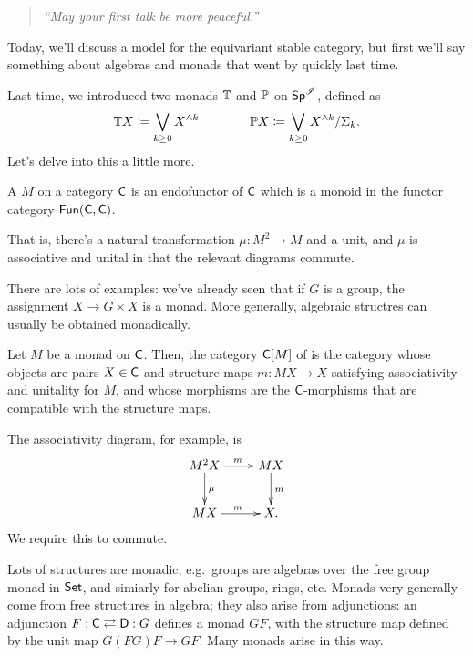 \begin{quote}\textit{
	``May your first talk be more peaceful.''
}\end{quote}
Today, we'll discuss a model for the equivariant stable category, but first we'll say something about algebras and
monads that went by quickly last time.

Last time, we introduced two monads $\T$ and $\P$ on $\Spc^\sI$, defined as
\[\T X\coloneqq \bigvee_{k\ge 0} X^{\wedge k}\qquad\qquad \P X\coloneqq \bigvee_{k\ge 0} X^{\wedge k}/\Sigma_k.\]
Let's delve into this a little more.
\begin{defn}
A  $M$ on a category $\fC$ is an endofunctor of $\fC$ which is a monoid in the functor category
$\Fun(\fC,\fC)$.
\end{defn}
That is, there's a natural transformation $\mu\colon M^2\to M$ and a unit, and $\mu$ is associative and unital in
that the relevant diagrams commute.

There are lots of examples: we've already seen that if $G$ is a group, the assignment $X\to G\times X$ is a monad.
More generally, algebraic structres can usually be obtained monadically.
\begin{defn}
Let $M$ be a monad on $\fC$. Then, the category $\fC[M]$ of  is the category whose objects
are pairs $X\in\fC$ and structure maps $m\colon MX\to X$ satisfying associativity and unitality for $M$, and whose
morphisms are the $\fC$-morphisms that are compatible with the structure maps.
\end{defn}
The associativity diagram, for example, is
\[\xymatrix{
	M^2X\ar[r]^m\ar[d]^\mu & MX\ar[d]^m\\
	MX\ar[r]^m & X.
}\]
We require this to commute.

Lots of structures are monadic, e.g.\ groups are algebras over the free group monad in $\Set$, and simiarly for
abelian groups, rings, etc. Monads very generally come from free structures in algebra; they also arise from
adjunctions: an adjunction $F:\fC\rightleftarrows\fD: G$ defines a monad $GF$, with the structure map defined by
the unit map $G(FG)F\to GF$. Many monads arise in this way.

